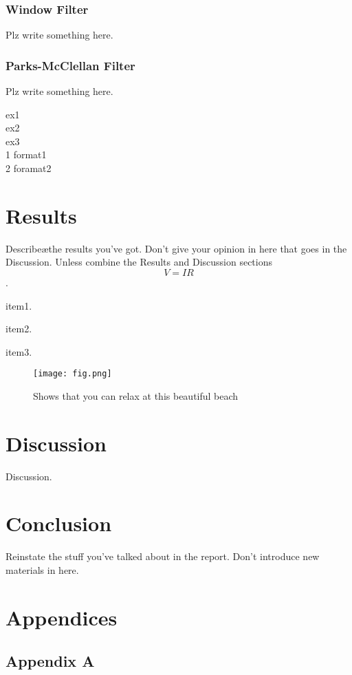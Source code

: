 \documentclass[a4paper, 11pt]{article}
\newcounter{foo}
\begin{document}
        \subsubsection{Window Filter}
            Plz write something here.
        \subsubsection{Parks-McClellan Filter}
            Plz write something here.
    
    \begin{flushleft}
        ex1\\
        ex2\\
        ex3\\
        1 format1\\
        2 foramat2\\
    \end{flushleft}

\section{Results}\label{sec:res}
    Describe\ae the results you've got. Don't give your opinion in here that goes in the Discussion.
    Unless combine the Results and Discussion sections \begin{equation} V = IR\end{equation}.

    \begin{list}{S-}{}
        \item item1.
        
        \item item2.
        
        \item item3.
    \end{list}

    \begin{figure}[h]
        \centering
        \graphicspath{{./wiki/}}
        \texttt{[image: fig.png]}
        \caption{Shows that you can relax at this beautiful beach}
        \label{Fig:my_label}
    \end{figure}

\section{Discussion}\label{sec:dis}
    Discussion.

\section{Conclusion}\label{sec:conc}
    Reinstate the stuff you've talked about in the report. Don't introduce new materials in here.

\pagebreak

\renewcommand{\bibname}{References}
\renewcommand{\bibsection}{\section{\bibname}}
\renewcommand{\cite}{\citep}

\pagebreak

\section{Appendices}
    \subsection{Appendix A}
\end{document}
